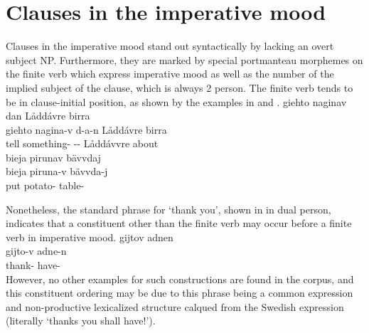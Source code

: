 \section{Clauses in the imperative mood}\label{imperClauses}
Clauses in the imperative mood stand out syntactically by lacking an overt subject NP. Furthermore, they are marked by special portmanteau morphemes %
on the finite verb which express imperative mood as well as the number of the implied subject of the clause, which is always 2 person. 
The finite verb tends to be in clause-initial position, as shown by the examples in  and .
\ea\label{impClause1}%
\glll	giehto naginav dan Låddávre birra\\
	giehto nagina-v d-a-n {Låddávre\footnotemark} birra\\
	tell\BS{} something- -- Låddávvre\BS{} about\\\nopagebreak
{} 
\z
\ea\label{impClause2}%
\glll	bieja pirunav bävvdaj\\
	bieja piruna-v bävvda-j\\
	put\BS{} potato- table-\\\nopagebreak
{} 
\z
{}

Nonetheless, the standard phrase for ‘thank you’, shown in  in dual person, indicates that a constituent other than the finite verb may occur before a finite verb in imperative mood.
\ea\label{impClause3}
\glll	gijtov adnen\\
	gijto-v adne-n\\
	thank- have-\\\nopagebreak
{} 
\z
However, no other examples for such constructions are found in the corpus, and this constituent ordering may be due to this phrase being a common expression and non-productive lexicalized structure calqued from the Swedish expression  (literally ‘thanks you shall have!’). 

